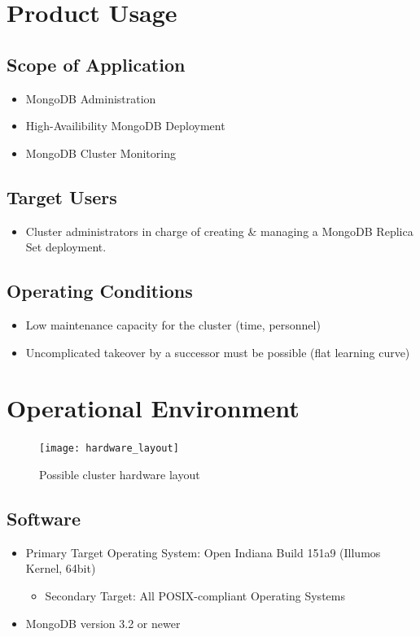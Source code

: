 \documentclass[a4paper, 11pt]{article}
\let\oldsection\section
\renewcommand\section{\clearpage\oldsection}
\begin{document}
\section{Product Usage}

\subsection{Scope of Application}
\begin{itemize}
\item \gls{MongoDB}  Administration
\item High-Availibility MongoDB Deployment
\item MongoDB Cluster Monitoring
\end{itemize}

\subsection{Target Users}
\begin{itemize}
\item Cluster \glspl{administrator} in charge of creating \& managing a MongoDB Replica Set deployment.
\end{itemize}

\subsection{Operating Conditions}
\begin{itemize}

\item Low maintenance capacity for the cluster (time, personnel)
\item Uncomplicated takeover by a successor must be possible (flat learning curve)
\end{itemize}

\section{Operational Environment}

\begin{figure}[H]
	\centering
	\texttt{[image: hardware\_layout]}
	\caption{Possible cluster hardware layout}
\end{figure}

\subsection{Software}\label{subsec:Software}
\begin{itemize}
\item Primary Target Operating System: Open Indiana Build 151a9 (Illumos Kernel, 64bit)
\begin{itemize}
	\item Secondary Target: All POSIX-compliant Operating Systems
\end{itemize}
\item MongoDB version 3.2 or newer
\end{itemize}
\end{document}
